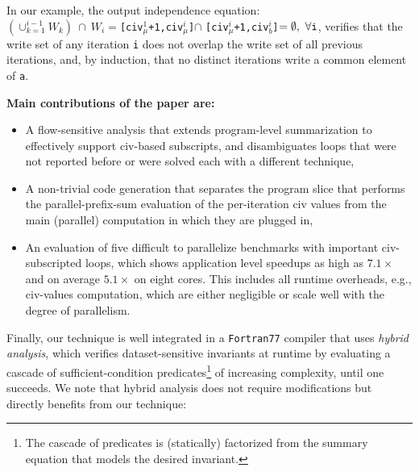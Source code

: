 \documentclass{sig-alternate}
\begin{document}
In our example, the output independence equation:\\
$(\cup_{k=1}^{i-1}W_k)~\cap~W_i = ${\tt [civ$_\mu^1$+1,civ$_\mu^i$]}$\cap$
{\tt [civ$_\mu^i$+1,civ$_b^i$]}$ = \emptyset,~\forall \mbox{\tt{}i}$,
verifies that the write set of any iteration {\tt i} does not overlap
the write set of all previous iterations, and, by induction,
that no distinct iterations write a common element of {\tt a}.



{\bf Main contributions of the paper are:}
\begin{itemize}
    \item A flow-sensitive analysis that extends program-level 
            summarization to effectively support {\sc civ}-based 
            subscripts, 
            and disambiguates loops that were not reported 
            before or were solved each with a different technique,

    \item A non-trivial code generation that separates the 
            program slice that performs the parallel-prefix-sum
            evaluation of the per-iteration {\sc civ} values 
            from the main (parallel) computation in which 
            they are plugged in,

    \item An evaluation of five difficult to parallelize benchmarks 
            with important {\sc civ}-subscripted loops, which
            shows application level speedups as high as 
            $7.1\times$ and on average $5.1\times$ on eight cores.
            This includes all runtime overheads, 
            e.g., {\sc civ}-values computation, which are either 
            negligible or scale well with the degree of parallelism.

\end  {itemize}

\enlargethispage{\baselineskip}

Finally, our technique is well integrated %
in a {\tt Fortran77} compiler that uses {\em hybrid analysis}, 
which verifies dataset-sensitive invariants %
at runtime by evaluating a cascade of sufficient-condition 
predicates\footnote{The cascade of predicates is (statically) 
factorized from the summary equation that models the desired invariant.} 
of increasing complexity, until one succeeds. 
%
We note that hybrid analysis does not require modifications
but directly benefits from our technique: 
\end{document}
